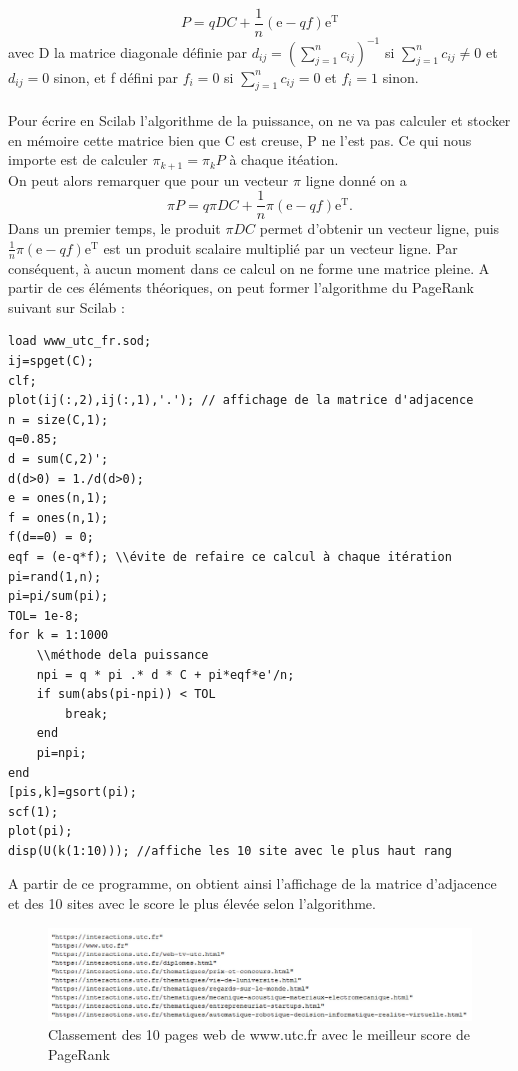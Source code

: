         $$
        P=qDC +\frac{1}{n}(\text{e}-qf)\text{e}^\text{T}
        $$
        avec D la matrice diagonale définie par $d_{ij}=(\sum^n_{j=1}c_{ij})^{-1} $ si $ \sum^n_{j=1}c_{ij} \neq 0 $ et $  d_{ij}=0$ sinon, et f défini par $f_{i}=0 $ si $ \sum^n_{j=1}c_{ij} = 0 $ et $  f_{i}=1$ sinon.
        \\\\Pour écrire en Scilab l'algorithme de la puissance, on ne va pas calculer et stocker en mémoire cette matrice bien que C est creuse, P ne l'est pas. Ce qui nous importe est de calculer $\pi_{k+1} = \pi_kP$ à chaque itéation.\\
        On peut alors remarquer que pour un vecteur $\pi$ ligne donné on a 
        $$
        \pi P=q\pi DC +\frac{1}{n}\pi(\text{e}-qf)\text{e}^\text{T}.
        $$
        Dans un premier temps, le produit $\pi DC$ permet d'obtenir un vecteur ligne, puis $\frac{1}{n}\pi(\text{e}-qf)\text{e}^\text{T}$ est un produit scalaire multiplié par un vecteur ligne. Par conséquent, à aucun moment dans ce calcul on ne forme une matrice pleine.
        A partir de ces éléments théoriques, on peut former l'algorithme du PageRank suivant sur Scilab :
        \begin{center}
          \begin{verbatim}
load www_utc_fr.sod;
ij=spget(C);
clf;
plot(ij(:,2),ij(:,1),'.'); // affichage de la matrice d'adjacence
n = size(C,1);
q=0.85;
d = sum(C,2)';
d(d>0) = 1./d(d>0);
e = ones(n,1);
f = ones(n,1);
f(d==0) = 0;
eqf = (e-q*f); \\évite de refaire ce calcul à chaque itération
pi=rand(1,n);
pi=pi/sum(pi);
TOL= 1e-8;
for k = 1:1000
    \\méthode dela puissance
    npi = q * pi .* d * C + pi*eqf*e'/n;
    if sum(abs(pi-npi)) < TOL
        break;
    end
    pi=npi;
end
[pis,k]=gsort(pi);
scf(1);
plot(pi);
disp(U(k(1:10))); //affiche les 10 site avec le plus haut rang
          \end{verbatim}
                \label{lst:code_20}
         \end{center}
         A partir de ce programme, on obtient ainsi l'affichage de la matrice d'adjacence et des 10 sites avec le score le plus élevée selon l'algorithme.
         \begin{figure}[H]
              \centering
                \includegraphics[width=1.1\textwidth]{images/classement.jpg}
              \caption{Classement des 10 pages web de www.utc.fr avec le meilleur score de PageRank}
              \label{fig:gr2}
            \end{figure}
